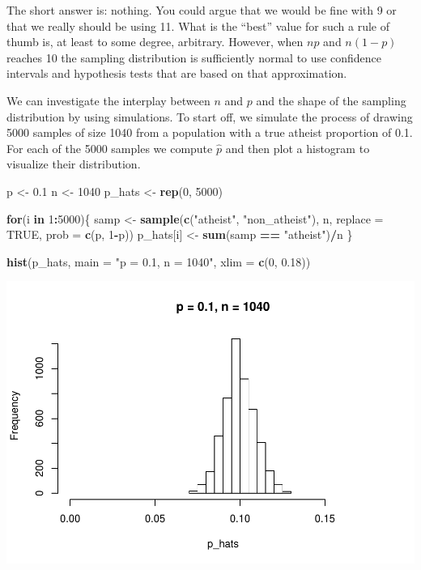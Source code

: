 \documentclass[]{article}
\newenvironment{Shaded}{\begin{snugshade}}{\end{snugshade}}
\newcommand{\KeywordTok}[1]{\textcolor[rgb]{0.13,0.29,0.53}{\textbf{#1}}}
\newcommand{\DataTypeTok}[1]{\textcolor[rgb]{0.13,0.29,0.53}{#1}}
\newcommand{\DecValTok}[1]{\textcolor[rgb]{0.00,0.00,0.81}{#1}}
\newcommand{\FloatTok}[1]{\textcolor[rgb]{0.00,0.00,0.81}{#1}}
\newcommand{\StringTok}[1]{\textcolor[rgb]{0.31,0.60,0.02}{#1}}
\newcommand{\OtherTok}[1]{\textcolor[rgb]{0.56,0.35,0.01}{#1}}
\newcommand{\ControlFlowTok}[1]{\textcolor[rgb]{0.13,0.29,0.53}{\textbf{#1}}}
\newcommand{\OperatorTok}[1]{\textcolor[rgb]{0.81,0.36,0.00}{\textbf{#1}}}
\newcommand{\NormalTok}[1]{#1}
\begin{document}
The short answer is: nothing. You could argue that we would be fine with
9 or that we really should be using 11. What is the ``best'' value for
such a rule of thumb is, at least to some degree, arbitrary. However,
when \(np\) and \(n(1-p)\) reaches 10 the sampling distribution is
sufficiently normal to use confidence intervals and hypothesis tests
that are based on that approximation.

We can investigate the interplay between \(n\) and \(p\) and the shape
of the sampling distribution by using simulations. To start off, we
simulate the process of drawing 5000 samples of size 1040 from a
population with a true atheist proportion of 0.1. For each of the 5000
samples we compute \(\hat{p}\) and then plot a histogram to visualize
their distribution.

\begin{Shaded}
\begin{Highlighting}[]
\NormalTok{p <-}\StringTok{ }\FloatTok{0.1}
\NormalTok{n <-}\StringTok{ }\DecValTok{1040}
\NormalTok{p_hats <-}\StringTok{ }\KeywordTok{rep}\NormalTok{(}\DecValTok{0}\NormalTok{, }\DecValTok{5000}\NormalTok{)}

\ControlFlowTok{for}\NormalTok{(i }\ControlFlowTok{in} \DecValTok{1}\OperatorTok{:}\DecValTok{5000}\NormalTok{)\{}
\NormalTok{  samp <-}\StringTok{ }\KeywordTok{sample}\NormalTok{(}\KeywordTok{c}\NormalTok{(}\StringTok{"atheist"}\NormalTok{, }\StringTok{"non_atheist"}\NormalTok{), n, }\DataTypeTok{replace =} \OtherTok{TRUE}\NormalTok{, }\DataTypeTok{prob =} \KeywordTok{c}\NormalTok{(p, }\DecValTok{1}\OperatorTok{-}\NormalTok{p))}
\NormalTok{  p_hats[i] <-}\StringTok{ }\KeywordTok{sum}\NormalTok{(samp }\OperatorTok{==}\StringTok{ "atheist"}\NormalTok{)}\OperatorTok{/}\NormalTok{n}
\NormalTok{\}}

\KeywordTok{hist}\NormalTok{(p_hats, }\DataTypeTok{main =} \StringTok{"p = 0.1, n = 1040"}\NormalTok{, }\DataTypeTok{xlim =} \KeywordTok{c}\NormalTok{(}\DecValTok{0}\NormalTok{, }\FloatTok{0.18}\NormalTok{))}
\end{Highlighting}
\end{Shaded}

\includegraphics{DATA_606_Lab_6_files/figure-latex/sim-np-1.pdf}
\end{document}
